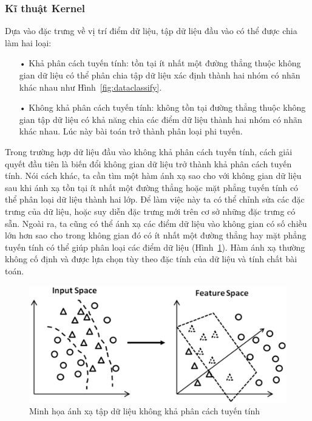 \subsubsection*{Kĩ thuật Kernel}
Dựa vào đặc trưng về vị trí điểm dữ liệu, tập dữ liệu đầu vào có thể được chia làm hai loại:
\begin{itemize}
\item[•] Khả phân cách tuyến tính: tồn tại ít nhất một đường thẳng thuộc không gian dữ liệu có thể phân chia tập dữ liệu xác định thành hai nhóm có nhãn khác nhau như Hình~\ref{fig:dataclassify}.
\item[•] Không khả phân cách tuyến tính: không tồn tại đường thẳng thuộc không gian tập dữ liệu có khả năng chia các điểm dữ liệu thành hai nhóm có nhãn khác nhau. Lúc này bài toán trở thành phân loại phi tuyến.
\end{itemize}
Trong trường hợp dữ liệu đầu vào không khả phân cách tuyến tính, cách giải quyết đầu tiên là biến đổi không gian dữ liệu trở thành khả phân cách tuyến tính. Nói cách khác, ta cần tìm một hàm ánh xạ sao cho với không gian dữ liệu sau khi ánh xạ tồn tại ít nhất một đường thẳng hoặc mặt phẳng tuyến tính có thể phân loại dữ liệu thành hai lớp. Để làm việc này ta có thể chỉnh sửa các đặc trưng của dữ liệu, hoặc suy diễn đặc trưng mới trên cơ sở những đặc trưng có sẵn. Ngoài ra, ta cũng có thể ánh xạ các điểm dữ liệu vào không gian có số chiều lớn hơn sao cho trong không gian đó có ít nhất một đường thẳng hay mặt phẳng tuyến tính có thể giúp phân loại các điểm dữ liệu (Hình~\ref{fig:axkernel}). Hàm ánh xạ thường không cố định và được lựa chọn tùy theo đặc tính của dữ liệu và tính chất bài toán.
\begin{figure}[h]
\centering
\includegraphics[scale=0.3]{hinh/kernel.png}
\caption[Caption for LOF]{Minh họa ánh xạ tập dữ liệu không khả phân cách tuyến tính \footnotemark}
\label{fig:axkernel}
\end{figure}
